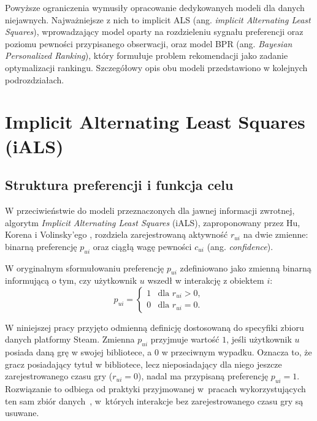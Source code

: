 Powyższe ograniczenia wymusiły opracowanie dedykowanych modeli dla danych niejawnych. Najważniejsze z nich to implicit ALS (ang. \textit{implicit Alternating Least Squares}), wprowadzający model oparty na rozdzieleniu sygnału preferencji oraz poziomu pewności przypisanego obserwacji, oraz model BPR (ang. \textit{Bayesian Personalized Ranking}), który formułuje problem rekomendacji jako zadanie optymalizacji rankingu. Szczegółowy opis obu modeli przedstawiono w kolejnych podrozdziałach.

\section{Implicit Alternating Least Squares (iALS)}

\subsection{Struktura preferencji i funkcja celu}

W przeciwieństwie do modeli przeznaczonych dla jawnej informacji zwrotnej, algorytm \textit{Implicit Alternating Least Squares} (iALS), zaproponowany przez Hu, Korena i Volinsky'ego \cite{hu2008implicit}, rozdziela zarejestrowaną aktywność $r_{ui}$ na dwie zmienne: binarną preferencję $p_{ui}$ oraz ciągłą wagę pewności $c_{ui}$ (ang. \textit{confidence}).

W oryginalnym sformułowaniu preferencję $p_{ui}$ zdefiniowano jako zmienną binarną informującą o tym, czy użytkownik $u$ wszedł w interakcję z obiektem $i$:
\begin{equation}
    p_{ui} = 
    \begin{cases} 
      1 & \text{dla } r_{ui} > 0, \\
      0 & \text{dla } r_{ui} = 0.
    \end{cases}
\end{equation}

W niniejszej pracy przyjęto odmienną definicję dostosowaną do specyfiki zbioru danych platformy Steam. Zmienna $p_{ui}$ przyjmuje wartość $1$, jeśli użytkownik $u$ posiada daną grę w swojej bibliotece, a $0$ w przeciwnym wypadku. Oznacza to, że gracz posiadający tytuł w bibliotece, lecz nieposiadający dla niego jeszcze zarejestrowanego czasu gry ($r_{ui} = 0$), nadal ma przypisaną preferencję $p_{ui} = 1$. Rozwiązanie to odbiega od praktyki przyjmowanej w~pracach wykorzystujących ten sam zbiór danych~\cite{bunga2021implicit,cheuque2019steam}, w~których interakcje bez zarejestrowanego czasu gry są usuwane.


